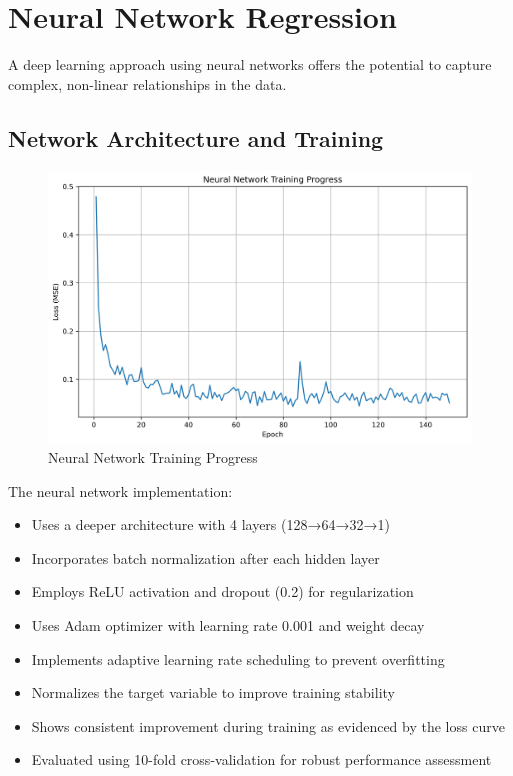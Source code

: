 \documentclass[12pt]{report}
\begin{document}
\section{Neural Network Regression}
A deep learning approach using neural networks offers the potential to capture complex, non-linear relationships in the data.

\subsection{Network Architecture and Training}
\begin{figure}[H]
    \centering
    \includegraphics[width=1.0\textwidth]{figures/neural_network_training.png}
    \caption{Neural Network Training Progress}
    \label{fig:nn_training}
\end{figure}

The neural network implementation:
\begin{itemize}
    \item Uses a deeper architecture with 4 layers (128→64→32→1)
    \item Incorporates batch normalization after each hidden layer
    \item Employs ReLU activation and dropout (0.2) for regularization
    \item Uses Adam optimizer with learning rate 0.001 and weight decay
    \item Implements adaptive learning rate scheduling to prevent overfitting
    \item Normalizes the target variable to improve training stability
    \item Shows consistent improvement during training as evidenced by the loss curve
    \item Evaluated using 10-fold cross-validation for robust performance assessment
\end{itemize}
\end{document}
